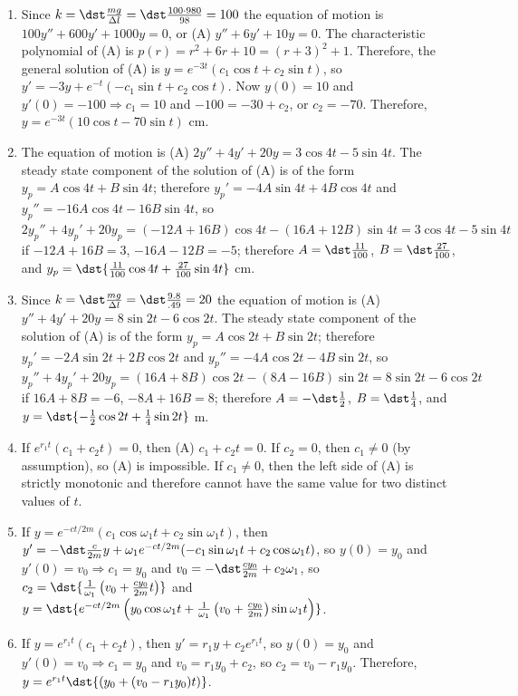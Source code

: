 \documentclass[openany]{book}
\newenvironment{sectionSolutions}{
 \begin{enumerate}[item-label={\thesection.\arabic{enumi}.}]
}{
 \end{enumerate}
}
\begin{document}
\begin{sectionSolutions}
\item
Since $k=\dst\frac{mg}{\Delta l}=\dst\frac{100\cdot980}{98}=100$ the
equation of motion is
$100y''+600y'+1000y=0$, or
(A) $y''+6y'+10y=0$.
The characteristic polynomial of (A) is
$p(r)=r^2+6r+10=(r+3)^2+1$. Therefore,
the general solution of (A) is
$y=e^{-3t}(c_1\cos t+c_2\sin t)$, so
$y'=-3y+e^{-t}(-c_1\sin t+c_2\cos t)$.
Now $y(0)=10$ and $y'(0)=-100\Rightarrow c_1=10$ and
$-100=-30+c_2$, or $c_2=-70$. Therefore,
$y=e^{-3t}(10\cos t-70\sin t)$ cm.


\item
The equation of motion is
(A) $2y''+4y'+20y=3\cos4t-5\sin4t$.
The steady  state component of the solution of (A)
is of the form
$y_p=A\cos4t+B\sin4t$; therefore $y_p'=-4A\sin4t+4B\cos4t$
and $y_p''=-16A\cos4t-16B\sin4t$, so
$2y_p''+4y_p'+20y_p=(-12A+16B)\cos4t-(16A+12B)\sin4t=3\cos4t-5\sin4t$
if $-12A+16B=3$, $-16A-12B=-5$; therefore $A=\dst\frac{11}{100}$,
$B=\dst\frac{27}{100}$, and
 $y_p=\dst{\frac{11}{100}\cos4t+\frac{27}{100}\sin4t}$ cm.



\item
Since $k=\dst\frac{mg}{\Delta l}=\dst\frac{9.8}{.49}=20$ the
equation of motion is
(A) $y''+4y'+20y=8\sin2t-6\cos2t$.
The steady  state component of the solution of (A)
is of the form
$y_p=A\cos2t+B\sin2t$; therefore $y_p'=-2A\sin2t+2B\cos2t$
and $y_p''=-4A\cos2t-4B\sin2t$, so
$y_p''+4y_p'+20y_p=(16A+8B)\cos2t-(8A-16B)\sin2t=8\sin2t-6\cos2t$
if $16A+8B=-6$, $-8A+16B=8$; therefore $A=-\dst\frac{1}{2}$,
$B=\dst\frac{1}{4}$, and
$y=\dst{-\frac{1}{2}\cos2t+\frac{1}{4}\sin2t}$ m.


\item
If $e^{r_1t}(c_1+c_2t)=0$, then (A) $c_1+c_2t=0$. If $c_2=0$, then
$c_1\ne0$ (by assumption), so (A) is impossible. If $c_1\ne0$, then the
left side of (A) is strictly monotonic and therefore cannot have the
same value for two distinct values of $t$.


\item
If $y=e^{-ct/2m}(c_1\cos\omega_1t+c_2\sin\omega_1t)$, then
$y'=-\dst\frac{c}{2m}y+\omega_1
e^{-ct/2m}(-c_1\sin\omega_1t+c_2\cos\omega_1t)$, so $y(0)=y_0$ and
$y'(0)=v_0\Rightarrow c_1=y_0$ and
$v_0=-\dst\frac{cy_0}{2m}+c_2\omega_1$, so $c_2=\dst{\frac{1}{\omega_1}
\left(v_0+\frac{cy_0}{2m}t\right)}$ and $y=\dst{e^{-ct/2m}
\left(y_0\cos\omega_1t+\frac{1}{\omega_1}\left(v_0+\frac{cy_0}{
2m}\right)\sin\omega_1t\right)}$.

\item
If $y=e^{r_1t}(c_1+c_2t)$, then $y'=r_1y+c_2e^{r_1t}$, so $y(0)=y_0$
and $y'(0)=v_0\Rightarrow c_1=y_0$ and $v_0=r_1y_0+c_2$, so
$c_2=v_0-r_1y_0$. Therefore,
$y=e^{r_1t}\dst{\left(y_0+(v_0-r_1y_0)t\right)}$.
\end{sectionSolutions}
\end{document}
